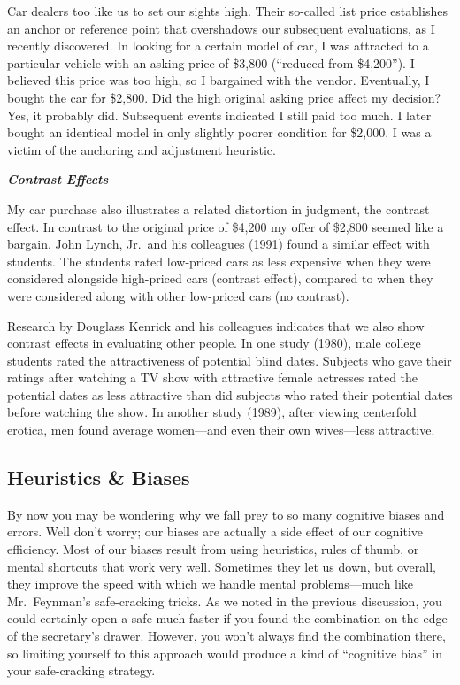 \documentclass[
]{book}
\begin{document}
Car dealers too like us to set our sights high. Their so-called list price establishes an anchor or reference point that overshadows our subsequent evaluations, as I recently discovered. In looking for a certain model of car, I was attracted to a particular vehicle with an asking price of \$3,800 (``reduced from \$4,200''). I believed this price was too high, so I bargained with the vendor. Eventually, I bought the car for \$2,800. Did the high original asking price affect my decision? Yes, it probably did. Subsequent events indicated I still paid too much. I later bought an identical model in only slightly poorer condition for \$2,000. I was a victim of the anchoring and adjustment heuristic.

\textbf{\emph{Contrast Effects}}

My car purchase also illustrates a related distortion in judgment, the contrast effect. In contrast to the original price of \$4,200 my offer of \$2,800 seemed like a bargain. John Lynch, Jr.~and his colleagues (1991) found a similar effect with students. The students rated low-priced cars as less expensive when they were considered alongside high-priced cars (contrast effect), compared to when they were considered along with other low-priced cars (no contrast).

Research by Douglass Kenrick and his colleagues indicates that we also show contrast effects in evaluating other people. In one study (1980), male college students rated the attractiveness of potential blind dates. Subjects who gave their ratings after watching a TV show with attractive female actresses rated the potential dates as less attractive than did subjects who rated their potential dates before watching the show. In another study (1989), after viewing centerfold erotica, men found average women---and even their own wives---less attractive.

\hypertarget{heuristics-biases}{%
\subsection*{Heuristics \& Biases}\label{heuristics-biases}}

By now you may be wondering why we fall prey to so many cognitive biases and errors. Well don't worry; our biases are actually a side effect of our cognitive efficiency. Most of our biases result from using heuristics, rules of thumb, or mental shortcuts that work very well. Sometimes they let us down, but overall, they improve the speed with which we handle mental problems---much like Mr.~Feynman's safe-cracking tricks. As we noted in the previous discussion, you could certainly open a safe much faster if you found the combination on the edge of the secretary's drawer. However, you won't always find the combination there, so limiting yourself to this approach would produce a kind of ``cognitive bias'' in your safe-cracking strategy.
\end{document}
